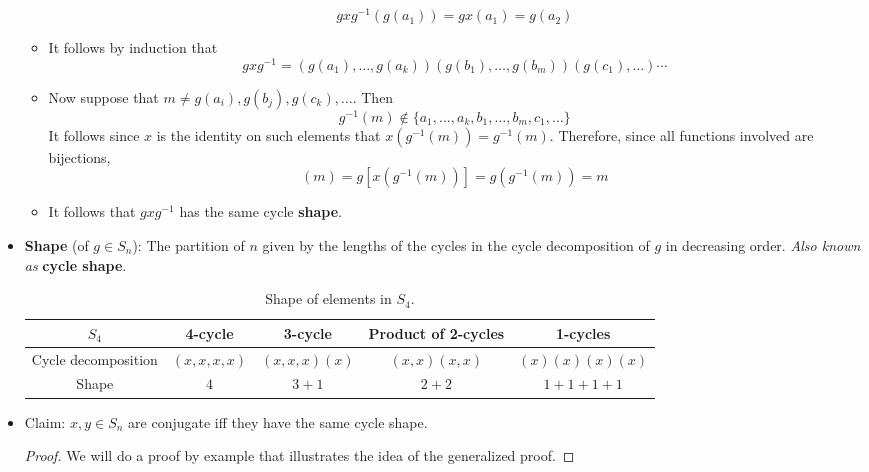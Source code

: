 \documentclass[../notes.tex]{subfiles}
\begin{document}
\begin{itemize}
\begin{itemize}
        \begin{equation*}
            gxg^{-1}(g(a_1)) = gx(a_1)
            = g(a_2)
        \end{equation*}
        \item It follows by induction that
        \begin{equation*}
            gxg^{-1} = (g(a_1),\dots,g(a_k))(g(b_1),\dots,g(b_m))(g(c_1),\dots)\cdots
        \end{equation*}
        \item Now suppose that $m\neq g(a_i),g(b_j),g(c_k),\dots$. Then
        \begin{equation*}
            g^{-1}(m) \notin \{a_1,\dots,a_k,b_1,\dots,b_m,c_1,\dots\}
        \end{equation*}
        It follows since $x$ is the identity on such elements that $x(g^{-1}(m))=g^{-1}(m)$. Therefore, since all functions involved are bijections,
        \begin{equation*}
            [gxg^{-1}](m) = g[x(g^{-1}(m))] = g(g^{-1}(m)) = m
        \end{equation*}
        \item It follows that $gxg^{-1}$ has the same cycle \textbf{shape}.
    \end{itemize}
    \item \textbf{Shape} (of $g\in S_n$): The partition of $n$ given by the lengths of the cycles in the cycle decomposition of $g$ in decreasing order. \emph{Also known as} \textbf{cycle shape}.
    \begin{table}[H]
        \centering
        \small
        \renewcommand{\arraystretch}{1.2}
        \begin{tabular}{c|c|c|c|c}
            $S_4$ & 4-cycle & 3-cycle & Product of 2-cycles & 1-cycles\\
            \hline
            Cycle decomposition & $(x,x,x,x)$ & $(x,x,x)(x)$ & $(x,x)(x,x)$ & $(x)(x)(x)(x)$\\
            Shape & $4$ & $3+1$ & $2+2$ & $1+1+1+1$\\
        \end{tabular}
        \caption{Shape of elements in $S_4$.}
        \label{tab:shapeS4}
    \end{table}
    \item Claim: $x,y\in S_n$ are conjugate iff they have the same cycle shape.
    \begin{proof}
        We will do a proof by example that illustrates the idea of the generalized proof.\par

\end{proof}
\end{itemize}
\end{document}
